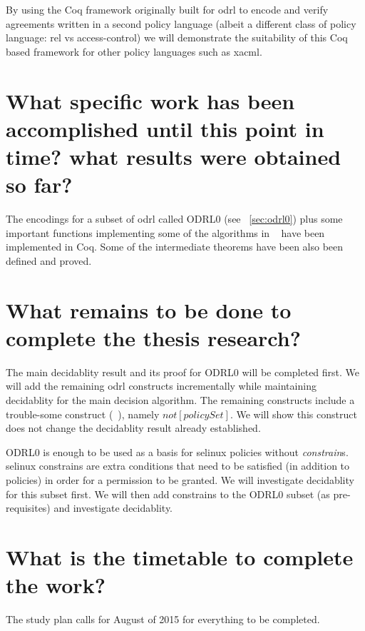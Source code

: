 By using the Coq framework originally built for \ac{odrl} to encode and verify agreements written in a second policy language (albeit a different class of policy language: \ac{rel} vs access-control) we will demonstrate the suitability of this Coq based framework for other policy languages such as \ac{xacml}.

\section{What specific work has been accomplished until this point in time? what results were obtained so far?}

The encodings for a subset of \ac{odrl} called ODRL0 (see ~\ref{sec:odrl0}) plus some important functions implementing some of the algorithms in ~\cite{pucella2006} have been implemented in Coq. Some of the intermediate theorems have been also been defined and proved.

\section{What remains to be done to complete the thesis research?}
The main decidablity result and its proof for ODRL0 will be completed first. We will add the remaining \ac{odrl} constructs incrementally while maintaining decidablity for the main decision algorithm. The remaining constructs include a trouble-some construct (~\cite{pucella2006}), namely $not[policySet]$. We will show this construct does not change the decidablity result already established. 

ODRL0 is enough to be used as a basis for \ac{selinux} policies without \emph{constrain}s. \ac{selinux} constrains are extra  conditions that need to be satisfied (in addition to policies) in order for a permission to be granted. We will investigate decidablity for this subset first. We will then add constrains to the ODRL0 subset (as pre-requisites) and investigate decidablity.



\section{What is the timetable to complete the work?}

The study plan calls for August of 2015 for everything to be completed.
